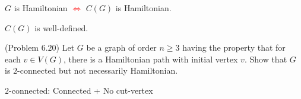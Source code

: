 \begin{frame}{}
  \begin{theorem}
    $G$ is Hamiltonian \textcolor<2->{red}{$\iff$} $C(G)$ is Hamiltonian.
  \end{theorem}
  

\end{frame}

\begin{frame}{}
  \begin{theorem}[]
    \begin{center}
      $C(G)$ is well-defined.
    \end{center}
  \end{theorem}
\end{frame}

\begin{frame}{}
  \begin{exampleblock}{(Problem $6.20$)}
    Let $G$ be a graph of order $n \ge 3$ having the property that
    for each $v \in V(G)$, there is a Hamiltonian path with initial vertex $v$.
    Show that $G$ is $2$-connected but not necessarily Hamiltonian.
  \end{exampleblock}

  \pause
  \begin{center}
    $2$-connected: Connected + No cut-vertex
  \end{center}

  \pause
  \begin{columns}
  \end{columns}
\end{frame}

\begin{frame}{}
\end{frame}
